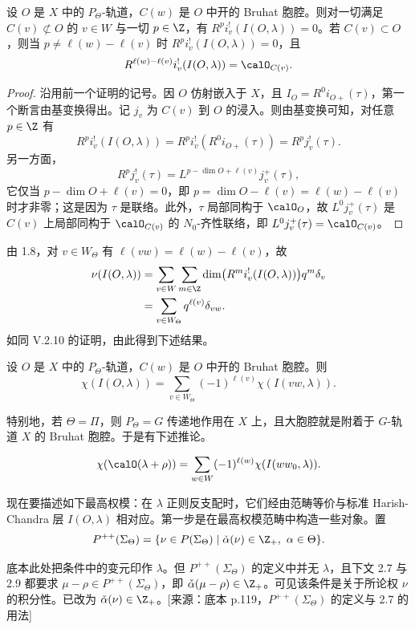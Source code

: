 \begin{lemma}\label{lem:06.2.4}
设 $O$ 是 $X$ 中的 $P_\Theta$-轨道，$C(w)$ 是 $O$ 中开的 Bruhat 胞腔。则对一切满足 $C(v)\not\subset O$ 的 $v\in W$ 与一切 $p\in\Z$，有 $R^pi_v^!(I(O,\lambda))=0$。若 $C(v)\subset O$，则当 $p\neq\ell(w)-\ell(v)$ 时 $R^pi_v^!(I(O,\lambda))=0$，且
$$R^{\ell(w)-\ell(v)}i_v^!(I(O,\lambda))=\calO_{C(v)}.$$
\end{lemma}

\begin{proof}
沿用前一个证明的记号。因 $O$ 仿射嵌入于 $X$，且 $I_O=R^0i_{O+}(\tau)$，第一个断言由基变换得出。记 $j_v$ 为 $C(v)$ 到 $O$ 的浸入。则由基变换可知，对任意 $p\in\Z$ 有
$$R^pi_v^!(I(O,\lambda))=R^pi_v^!(R^0i_{O+}(\tau))=R^pj_v^!(\tau).$$
另一方面，
$$R^pj_v^!(\tau)=L^{p-\dim O+\ell(v)}j_v^+(\tau),$$
它仅当 $p-\dim O+\ell(v)=0$，即 $p=\dim O-\ell(v)=\ell(w)-\ell(v)$ 时才非零；这是因为 $\tau$ 是联络。此外，$\tau$ 局部同构于 $\calO_O$，故 $L^0j_v^+(\tau)$ 是 $C(v)$ 上局部同构于 $\calO_{C(v)}$ 的 $N_0$-齐性联络，即 $L^0j_v^+(\tau)=\calO_{C(v)}$。
\end{proof}

由 1.8，对 $v\in W_\Theta$ 有 $\ell(vw)=\ell(w)-\ell(v)$，故
\begin{align*}
\nu(I(O,\lambda))&=\sum_{v\in W}\sum_{m\in\Z}\dim\bigl(R^mi_v^!(I(O,\lambda))\bigr)q^m\delta_v\\
&=\sum_{v\in W_\Theta}q^{\ell(v)}\delta_{vw}.
\end{align*}
如同 V.2.10 的证明，由此得到下述结果。

\begin{proposition}\label{prop:06.2.5}
设 $O$ 是 $X$ 中的 $P_\Theta$-轨道，$C(w)$ 是 $O$ 中开的 Bruhat 胞腔。则
$$\chi(I(O,\lambda))=\sum_{v\in W_\Theta}(-1)^{\ell(v)}\chi(I(vw,\lambda)).$$
\end{proposition}

特别地，若 $\Theta=\Pi$，则 $P_\Theta=G$ 传递地作用在 $X$ 上，且大胞腔就是附着于 $G$-轨道 $X$ 的 Bruhat 胞腔。于是有下述推论。

\begin{corollary}\label{cor:06.2.6}
$$\chi(\calO(\lambda+\rho))=\sum_{w\in W}(-1)^{\ell(w)}\chi(I(ww_0,\lambda)).$$
\end{corollary}

现在要描述如下最高权模：在 $\lambda$ 正则反支配时，它们经由范畴等价与标准 Harish-Chandra 层 $I(O,\lambda)$ 相对应。第一步是在最高权模范畴中构造一些对象。置
$$P^{++}(\Sigma_\Theta)=\{\nu\in P(\Sigma_\Theta)\mid \check\alpha(\nu)\in\Z_+,\ \alpha\in\Theta\}.$$
\begin{annote}
底本此处把条件中的变元印作 $\lambda$。但 $P^{++}(\Sigma_\Theta)$ 的定义中并无 $\lambda$，且下文 2.7 与 2.9 都要求 $\mu-\rho\in P^{++}(\Sigma_\Theta)$，即 $\check\alpha(\mu-\rho)\in\Z_+$。可见该条件是关于所论权 $\nu$ 的积分性。已改为 $\check\alpha(\nu)\in\Z_+$。[来源：底本 p.119，$P^{++}(\Sigma_\Theta)$ 的定义与 2.7 的用法]
\end{annote}

